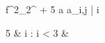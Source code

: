 \begin{eqcode}{f}{}{^{2}_{2}}{^{}}
  \alpha \in {} \lend
  \alpha {} + 5 \lend
  \omega \gets a \lend
   \lend
  a_{i,j} | \forall i \gets
  \begin { cases }
  5 & i : i < 3  & \otherwise \lend
  \end { cases } \lend
\end{eqcode}
